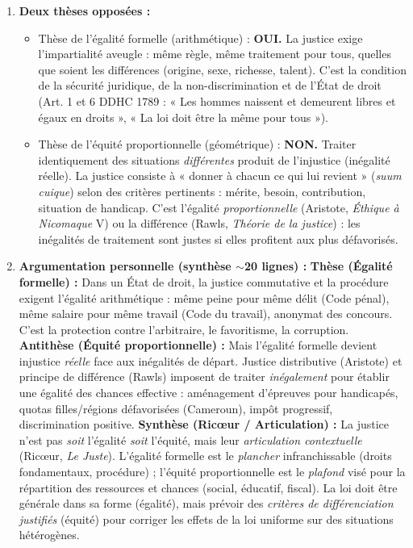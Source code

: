 \documentclass[11pt]{article}
\newcommand{\cle}[1]{{\popxbold\color{popdark}#1}}
\begin{document}
\begin{corrige}
\begin{enumerate}
\item \textbf{Deux thèses opposées :}
      \begin{itemize}
      \item \cle{Thèse de l'égalité formelle (arithmétique) :} \textbf{OUI.} La justice exige l'impartialité aveugle : même règle, même traitement pour tous, quelles que soient les différences (origine, sexe, richesse, talent). C'est la condition de la sécurité juridique, de la non-discrimination et de l'État de droit (Art. 1 et 6 DDHC 1789 : « Les hommes naissent et demeurent libres et égaux en droits », « La loi doit être la même pour tous »).
      \item \cle{Thèse de l'équité proportionnelle (géométrique) :} \textbf{NON.} Traiter identiquement des situations \emph{différentes} produit de l'injustice (inégalité réelle). La justice consiste à « donner à chacun ce qui lui revient » (\emph{suum cuique}) selon des critères pertinents : mérite, besoin, contribution, situation de handicap. C'est l'égalité \emph{proportionnelle} (Aristote, \emph{Éthique à Nicomaque} V) ou la \cle{différence} (Rawls, \emph{Théorie de la justice}) : les inégalités de traitement sont justes si elles profitent aux plus défavorisés.
      \end{itemize}
\item \textbf{Argumentation personnelle (synthèse $\sim$20 lignes) :}
      \textbf{Thèse (Égalité formelle) :} Dans un État de droit, la \cle{justice commutative} et la \cle{procédure} exigent l'égalité arithmétique : même peine pour même délit (Code pénal), même salaire pour même travail (Code du travail), anonymat des concours. C'est la protection contre l'arbitraire, le favoritisme, la corruption. \textbf{Antithèse (Équité proportionnelle) :} Mais l'égalité formelle devient injustice \emph{réelle} face aux inégalités de départ. \cle{Justice distributive} (Aristote) et \cle{principe de différence} (Rawls) imposent de traiter \emph{inégalement} pour établir une égalité des chances effective : aménagement d'épreuves pour handicapés, quotas filles/régions défavorisées (Cameroun), impôt progressif, discrimination positive. \textbf{Synthèse (Ricœur / Articulation) :} La justice n'est pas \emph{soit} l'égalité \emph{soit} l'équité, mais leur \emph{articulation contextuelle} (Ricœur, \emph{Le Juste}). L'égalité formelle est le \emph{plancher} infranchissable (droits fondamentaux, procédure) ; l'équité proportionnelle est le \emph{plafond} visé pour la répartition des ressources et chances (social, éducatif, fiscal). La loi doit être générale dans sa forme (égalité), mais prévoir des \emph{critères de différenciation justifiés} (équité) pour corriger les effets de la loi uniforme sur des situations hétérogènes.

\end{enumerate}
\end{corrige}
\end{document}
